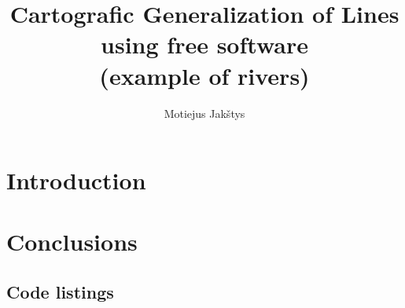\documentclass[a4paper]{article}
\title{
    Cartografic Generalization of Lines using free software \\
    (example of rivers) \\ \vspace{4mm}
}
\author{Motiejus Jakštys}
\date{
    \vspace{10mm}
    Version: \VCDescribe \\ \vspace{4mm}
    Generated At: \GeneratedAt

}
\begin{document}
\maketitle

\begin{abstract}
\label{sec:abstract}

\end{abstract}

\newpage

\tableofcontents
\listoffigures

\newpage

\section{Introduction}
\label{sec:introduction}

\section{Conclusions}
\label{sec:conclusions}

\printbibliography

\begin{appendices}

\section{Code listings}

\end{appendices}
\end{document}

